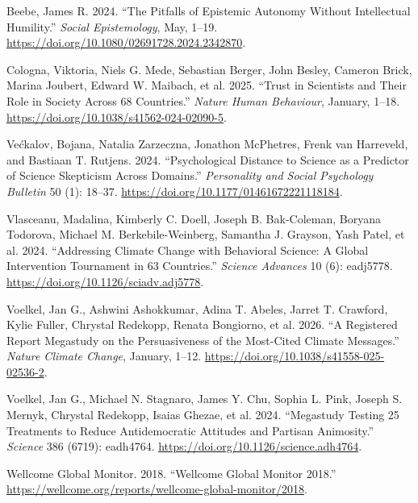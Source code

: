 \documentclass[
  letterpaper,
  DIV=11,
  numbers=noendperiod]{scrartcl}
\newlength{\cslhangindent}
\newenvironment{CSLReferences}[2] %
 {\begin{list}{}{%
  \setlength{\itemindent}{0pt}
  \setlength{\leftmargin}{0pt}
  \setlength{\parsep}{0pt}
  \ifodd #1
   \setlength{\leftmargin}{\cslhangindent}
   \setlength{\itemindent}{-1\cslhangindent}
  \fi
  \setlength{\itemsep}{#2\baselineskip}}}
 {\end{list}}
\begin{document}
\label{refs}
\begin{CSLReferences}{1}{0}
Beebe, James R. 2024. {``The Pitfalls of Epistemic Autonomy Without
Intellectual Humility.''} \emph{Social Epistemology}, May, 1--19.
\url{https://doi.org/10.1080/02691728.2024.2342870}.

Cologna, Viktoria, Niels G. Mede, Sebastian Berger, John Besley, Cameron
Brick, Marina Joubert, Edward W. Maibach, et al. 2025. {``Trust in
Scientists and Their Role in Society Across 68 Countries.''}
\emph{Nature Human Behaviour}, January, 1--18.
\url{https://doi.org/10.1038/s41562-024-02090-5}.

Većkalov, Bojana, Natalia Zarzeczna, Jonathon McPhetres, Frenk van
Harreveld, and Bastiaan T. Rutjens. 2024. {``Psychological Distance to
Science as a Predictor of Science Skepticism Across Domains.''}
\emph{Personality and Social Psychology Bulletin} 50 (1): 18--37.
\url{https://doi.org/10.1177/01461672221118184}.

Vlasceanu, Madalina, Kimberly C. Doell, Joseph B. Bak-Coleman, Boryana
Todorova, Michael M. Berkebile-Weinberg, Samantha J. Grayson, Yash
Patel, et al. 2024. {``Addressing Climate Change with Behavioral
Science: A Global Intervention Tournament in 63 Countries.''}
\emph{Science Advances} 10 (6): eadj5778.
\url{https://doi.org/10.1126/sciadv.adj5778}.

Voelkel, Jan G., Ashwini Ashokkumar, Adina T. Abeles, Jarret T.
Crawford, Kylie Fuller, Chrystal Redekopp, Renata Bongiorno, et al.
2026. {``A Registered Report Megastudy on the Persuasiveness of the
Most-Cited Climate Messages.''} \emph{Nature Climate Change}, January,
1--12. \url{https://doi.org/10.1038/s41558-025-02536-2}.

Voelkel, Jan G., Michael N. Stagnaro, James Y. Chu, Sophia L. Pink,
Joseph S. Mernyk, Chrystal Redekopp, Isaias Ghezae, et al. 2024.
{``Megastudy Testing 25 Treatments to Reduce Antidemocratic Attitudes
and Partisan Animosity.''} \emph{Science} 386 (6719): eadh4764.
\url{https://doi.org/10.1126/science.adh4764}.

Wellcome Global Monitor. 2018. {``Wellcome Global Monitor 2018.''}
\url{https://wellcome.org/reports/wellcome-global-monitor/2018}.

\end{CSLReferences}
\end{document}
